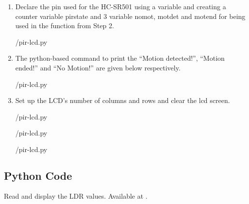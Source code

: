 \begin{enumerate}
  \item  Declare the pin used for the HC-SR501 using a variable and creating a counter variable pirstate and 3 variable nomot, motdet and motend for being used in the function from Step 2.
        
        {\LocPIRpycode/pir-lcd.py} 
 \item The python-based command to print the “Motion detected!”, “Motion ended!” and “No Motion!” are given below respectively.
        
	{\LocPIRpycode/pir-lcd.py} 
 \item Set up the LCD's number of columns and rows and clear the lcd screen.
        
	{\LocPIRpycode/pir-lcd.py}
	
	{\LocPIRpycode/pir-lcd.py}
	
        {\LocPIRpycode/pir-lcd.py} 

\end{enumerate}



\subsection{Python Code}
\label{sec:ldr-python-code}

\begin{pycode}
  {Read and display the LDR values.  Available at
    .}
  \label{py:ldr-read}
  
\end{pycode}

